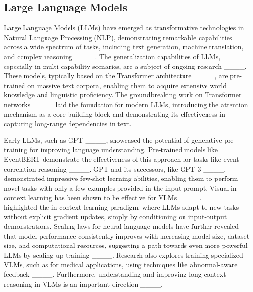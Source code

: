 \subsection{Large Language Models}

Large Language Models (LLMs) have emerged as transformative technologies in Natural Language Processing (NLP), demonstrating remarkable capabilities across a wide spectrum of tasks, including text generation, machine translation, and complex reasoning ____.  The generalization capabilities of LLMs, especially in multi-capability scenarios, are a subject of ongoing research ____. These models, typically based on the Transformer architecture ____, are pre-trained on massive text corpora, enabling them to acquire extensive world knowledge and linguistic proficiency.  The groundbreaking work on Transformer networks ____ laid the foundation for modern LLMs, introducing the attention mechanism as a core building block and demonstrating its effectiveness in capturing long-range dependencies in text.

Early LLMs, such as GPT ____, showcased the potential of generative pre-training for improving language understanding.  Pre-trained models like EventBERT demonstrate the effectiveness of this approach for tasks like event correlation reasoning ____. GPT and its successors, like GPT-3 ____, demonstrated impressive few-shot learning abilities, enabling them to perform novel tasks with only a few examples provided in the input prompt.  Visual in-context learning has been shown to be effective for VLMs ____.  ____ highlighted the in-context learning paradigm, where LLMs adapt to new tasks without explicit gradient updates, simply by conditioning on input-output demonstrations.  Scaling laws for neural language models have further revealed that model performance consistently improves with increasing model size, dataset size, and computational resources, suggesting a path towards even more powerful LLMs by scaling up training ____.  Research also explores training specialized VLMs, such as for medical applications, using techniques like abnormal-aware feedback ____. Furthermore, understanding and improving long-context reasoning in VLMs is an important direction ____.


